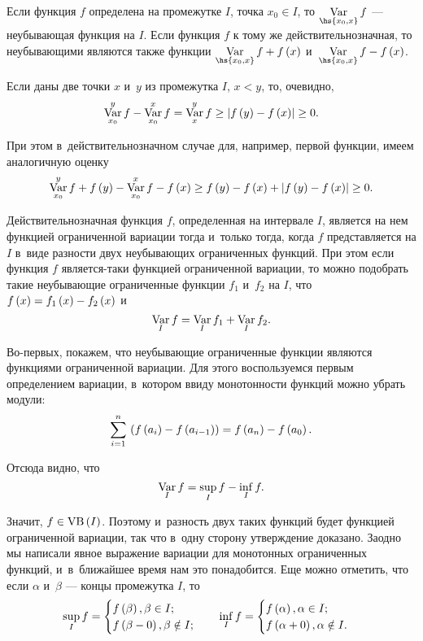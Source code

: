 \documentclass[draft]{article}
\begin{document}
\lm

Если функция $f$ определена на промежутке $I$, точка $x_0\in I$, то
$\var_{\hs{x_0,x}} f$ --- неубывающая функция на $I$. Если функция
$f$ к тому же действительнозначная, то неубывающими являются также
функции $\var_{\hs{x_0,x}} f+f\atx$ и~$\var_{\hs{x_0,x}} f-f\atx$.

\pr

Если даны две точки $x$ и~$y$ из промежутка $I$, $x<y$, то,
очевидно,
$$\var_{x_0}^yf-\var_{x_0}^xf=\var_x^yf\ge\abs{f\at(y)-f\at(x)}\ge0.$$

При этом в~действительнозначном случае для, например, первой
функции, имеем аналогичную оценку
$$\var_{x_0}^yf+f\at(y)-\var_{x_0}^xf-f\at(x)\ge
f\at(y)-f\at(x)+\abs{f\at(y)-f\at(x)}\ge0.$$

\prlm

\eject

\bigskip

\ut

Действительнозначная функция $f$, определенная на интервале $I$,
является на нем функцией ограниченной вариации тогда и~только тогда,
когда $f$ представляется на $I$ в~виде разности двух неубывающих
ограниченных функций. При этом если функция $f$ является-таки
функцией ограниченной вариации, то можно подобрать такие неубывающие
ограниченные функции $f_1$ и~$f_2$ на $I$, что
$f\atx=f_1\atx-f_2\atx$ и~$$\mathop{\mathrm{Var}}\limits_If=\mathop{\mathrm{Var}}\limits_If_1+\mathop{\mathrm{Var}}\limits_If_2.$$

\pr

Во-первых, покажем, что неубывающие ограниченные функции являются
функциями ограниченной вариации. Для этого воспользуемся первым
определением вариации, в~котором ввиду монотонности функций можно
убрать модули:
$$\sum_{i=1}^n\,\at({f\at(a_i)-f\at(a_{i-1})})=f\at(a_n)-f\at(a_0).$$

Отсюда видно, что $$\mathop{\mathrm{Var}}\limits_If=\sup\limits_If-\inf\limits_If.$$

Значит, $f\isvb\at(I)$. Поэтому и~разность двух таких функций будет
функцией ограниченной вариации, так что в~одну сторону утверждение
доказано. Заодно мы написали явное выражение вариации для монотонных
ограниченных функций, и~в~ближайшее время нам это понадобится. Еще
можно отметить, что если $\alpha$ и~$\beta$ --- концы промежутка
$I$, то
$$\sup_If=\begin{cases}f\at(\beta),\beta\in I;\cr f\at(\beta-0),
\beta\notin I;\end{cases}\quad
\inf_If=\begin{cases}f\at(\alpha),\alpha\in I;\cr
f\at(\alpha+0),\alpha\notin I.\end{cases}$$
\end{document}

